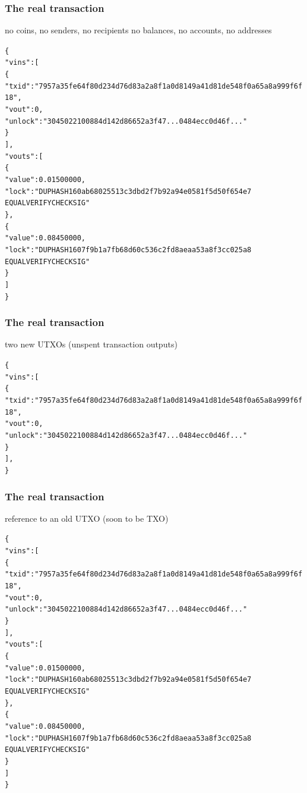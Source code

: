 \documentclass[11pt]{beamer}  %
\begin{document}
\begin{frame}[fragile]\frametitle{The real transaction}

  \begin{center}
    no coins, no senders, no recipients no balances, no accounts, no addresses
  \end{center}

  {\scriptsize\begin{alltt}
\{
  "vins": [
    \{
      "txid": "7957a35fe64f80d234d76d83a2a8f1a0d8149a41d81de548f0a65a8a999f6f18",
      "vout": 0,
      "unlock": "3045022100884d142d86652a3f47... 0484ecc0d46f..."
    \}
  ],
  "vouts": [
    \{
      "value": 0.01500000,
      "lock": "DUP HASH160 ab68025513c3dbd2f7b92a94e0581f5d50f654e7 
               EQUALVERIFY CHECKSIG"
    \},
    \{
      "value": 0.08450000,
      "lock": "DUP HASH160 7f9b1a7fb68d60c536c2fd8aeaa53a8f3cc025a8
               EQUALVERIFY CHECKSIG"
    \}
  ]
\}
\end{alltt}}

\end{frame}

\begin{frame}[fragile]\frametitle{The real transaction}

  \begin{center}
    two new UTXOs (unspent transaction outputs)
  \end{center}

  {\scriptsize\begin{alltt}
\{
  "vins": [
    \{
      "txid": "7957a35fe64f80d234d76d83a2a8f1a0d8149a41d81de548f0a65a8a999f6f18",
      "vout": 0,
      "unlock": "3045022100884d142d86652a3f47... 0484ecc0d46f..."
    \}
  ],
\}
\end{alltt}}

\end{frame}

\begin{frame}[fragile]\frametitle{The real transaction}

  \begin{center}
    reference to an old UTXO (soon to be TXO)
  \end{center}

  {\scriptsize\begin{alltt}
\{
  \alert{"vins": [
    \{
      "txid": "7957a35fe64f80d234d76d83a2a8f1a0d8149a41d81de548f0a65a8a999f6f18",
      "vout": 0,
      "unlock": "3045022100884d142d86652a3f47... 0484ecc0d46f..."
    \}
  ]},
  "vouts": [
    \{
      "value": 0.01500000,
      "lock": "DUP HASH160 ab68025513c3dbd2f7b92a94e0581f5d50f654e7
               EQUALVERIFY CHECKSIG"
    \},
    \{
      "value": 0.08450000,
      "lock": "DUP HASH160 7f9b1a7fb68d60c536c2fd8aeaa53a8f3cc025a8
               EQUALVERIFY CHECKSIG"
    \}
  ]
\}
\end{alltt}}

\end{frame}
\end{document}
